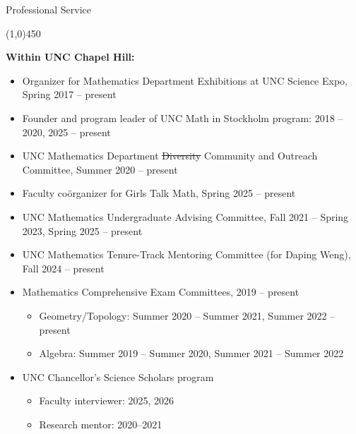 \documentclass[10pt]{article}
\begin{document}





\bigskip
\noindent
{\large \sc Professional Service}

\vspace{-0.1in}
\noindent
\line(1,0){450}
\smallskip

\noindent\textbf{Within UNC Chapel Hill:}

\begin{itemize}

\item Organizer for Mathematics Department Exhibitions at UNC Science Expo, Spring 2017 -- present

\item Founder and program leader of UNC Math in Stockholm program: 2018 -- 2020, 2025 -- present

\item UNC Mathematics Department \sout{Diversity} Community and Outreach Committee, Summer 2020 -- present

\item Faculty co\"{o}rganizer for Girls Talk Math, Spring 2025 -- present

\item UNC Mathematics Undergraduate Advising Committee, Fall 2021 -- Spring 2023, Spring 2025 -- present

\item UNC Mathematics Tenure-Track Mentoring Committee (for Daping Weng), 
Fall 2024 -- present

\item Mathematics Comprehensive Exam Committees, 2019 -- present
\begin{itemize}
\item Geometry/Topology: Summer 2020 -- Summer 2021, Summer 2022 -- present
\item Algebra: Summer 2019 -- Summer 2020, Summer 2021 -- Summer 2022
\end{itemize}


\item UNC Chancellor's Science Scholars program
\begin{itemize}
\item Faculty interviewer: 2025, 2026
\item Research mentor: 2020--2021
\end{itemize}


\end{itemize}
\end{document}
